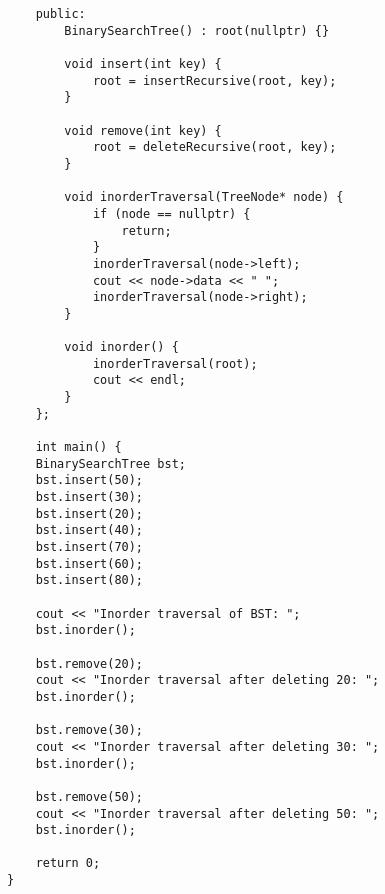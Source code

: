 \begin{tcolorbox}
\begin{verbatim}
    public:
        BinarySearchTree() : root(nullptr) {}
    
        void insert(int key) {
            root = insertRecursive(root, key);
        }
    
        void remove(int key) {
            root = deleteRecursive(root, key);
        }
    
        void inorderTraversal(TreeNode* node) {
            if (node == nullptr) {
                return;
            }
            inorderTraversal(node->left);
            cout << node->data << " ";
            inorderTraversal(node->right);
        }
    
        void inorder() {
            inorderTraversal(root);
            cout << endl;
        }
    };
    
    int main() {
    BinarySearchTree bst;
    bst.insert(50);
    bst.insert(30);
    bst.insert(20);
    bst.insert(40);
    bst.insert(70);
    bst.insert(60);
    bst.insert(80);

    cout << "Inorder traversal of BST: ";
    bst.inorder();

    bst.remove(20);
    cout << "Inorder traversal after deleting 20: ";
    bst.inorder();

    bst.remove(30);
    cout << "Inorder traversal after deleting 30: ";
    bst.inorder();

    bst.remove(50);
    cout << "Inorder traversal after deleting 50: ";
    bst.inorder();

    return 0;
}
\end{verbatim}
\end{tcolorbox}


